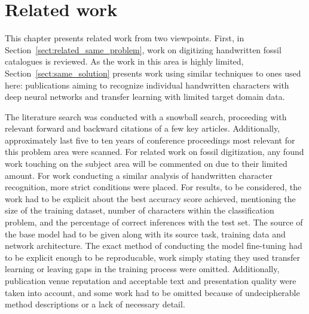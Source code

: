 \documentclass{article}
\begin{document}
\section{Related work}


This chapter presents related work from two viewpoints. First, in Section~\ref{sect:related_same_problem},
work on digitizing handwritten fossil catalogues is reviewed. As the work 
in this area is highly limited, Section~\ref{sect:same_solution} presents work using similar techniques 
to ones used here: publications aiming to recognize individual handwritten characters 
with deep neural networks and transfer learning with limited target domain data.


The literature search was conducted with a snowball search, proceeding with relevant forward and backward citations 
of a few key articles. Additionally, approximately last five to ten years of conference proceedings most relevant for this problem area were 
scanned. For related work on fossil digitization, any found work touching on the subject area will be commented on due to their 
limited amount. For work conducting a similar analysis of handwritten character recognition, more strict conditions were placed. 
For results, to be considered, the work had to be explicit about the best accuracy score achieved,
mentioning the size of the training dataset, number of characters within the classification problem, and the percentage 
of correct inferences with the test set. The source of the base model had to be given along with its source task, training data
and network architecture. The exact method of conducting the model fine-tuning had to be explicit enough to be reproducable,
work simply stating they used transfer learning or leaving gaps in the training process were omitted. Additionally, 
publication venue reputation and acceptable text and presentation quality were taken into account, and some work had to be
omitted because of undecipherable method descriptions or a lack of necessary detail.

\end{document}
